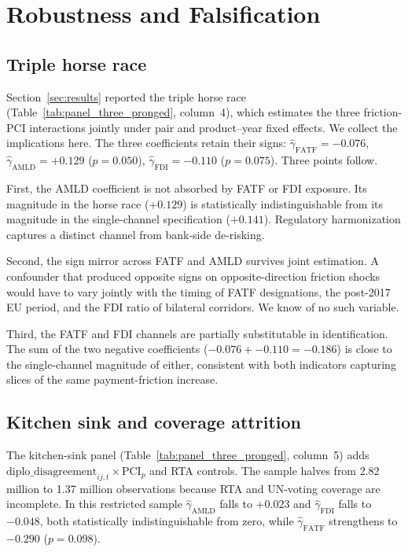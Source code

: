 \section{Robustness and Falsification}
\label{sec:robustness}

\subsection{Triple horse race}
\label{subsec:robust_horserace}

Section~\ref{sec:results} reported the triple horse race (Table~\ref{tab:panel_three_pronged}, column~4), which estimates the three friction-PCI interactions jointly under pair and product--year fixed effects. We collect the implications here. The three coefficients retain their signs: $\hat{\gamma}_{\text{FATF}} = -0.076$, $\hat{\gamma}_{\text{AMLD}} = +0.129$ ($p = 0.050$), $\hat{\gamma}_{\text{FDI}} = -0.110$ ($p = 0.075$). Three points follow.

First, the AMLD coefficient is not absorbed by FATF or FDI exposure. Its magnitude in the horse race ($+0.129$) is statistically indistinguishable from its magnitude in the single-channel specification ($+0.141$). Regulatory harmonization captures a distinct channel from bank-side de-risking.

Second, the sign mirror across FATF and AMLD survives joint estimation. A confounder that produced opposite signs on opposite-direction friction shocks would have to vary jointly with the timing of FATF designations, the post-2017 EU period, and the FDI ratio of bilateral corridors. We know of no such variable.

Third, the FATF and FDI channels are partially substitutable in identification. The sum of the two negative coefficients ($-0.076 + -0.110 = -0.186$) is close to the single-channel magnitude of either, consistent with both indicators capturing slices of the same payment-friction increase.

\subsection{Kitchen sink and coverage attrition}
\label{subsec:robust_kitchen}

The kitchen-sink panel (Table~\ref{tab:panel_three_pronged}, column~5) adds $\text{diplo\_disagreement}_{ij,t} \times \text{PCI}_p$ and RTA controls. The sample halves from 2.82 million to 1.37 million observations because RTA and UN-voting coverage are incomplete. In this restricted sample $\hat{\gamma}_{\text{AMLD}}$ falls to $+0.023$ and $\hat{\gamma}_{\text{FDI}}$ falls to $-0.048$, both statistically indistinguishable from zero, while $\hat{\gamma}_{\text{FATF}}$ strengthens to $-0.290$ ($p = 0.098$).

